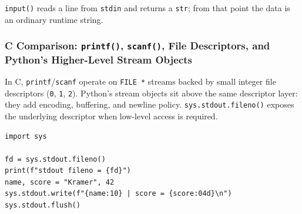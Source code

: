 \texttt{input()} reads a line from \texttt{stdin} and returns a \texttt{str}; from that point the data is an ordinary runtime string.

\subsubsection{C Comparison: \texttt{printf()}, \texttt{scanf()}, File Descriptors, and Python's Higher-Level Stream Objects}

In C, \texttt{printf}/\texttt{scanf} operate on \texttt{FILE *} streams backed by small integer file descriptors (\texttt{0}, \texttt{1}, \texttt{2}). Python's stream objects sit above the same descriptor layer: they add encoding, buffering, and newline policy. \texttt{sys.stdout.fileno()} exposes the underlying descriptor when low-level access is required.

\begin{verbatim}
import sys

fd = sys.stdout.fileno()
print(f"stdout fileno = {fd}")
name, score = "Kramer", 42
sys.stdout.write(f"{name:10} | score = {score:04d}\n")
sys.stdout.flush()
\end{verbatim}
